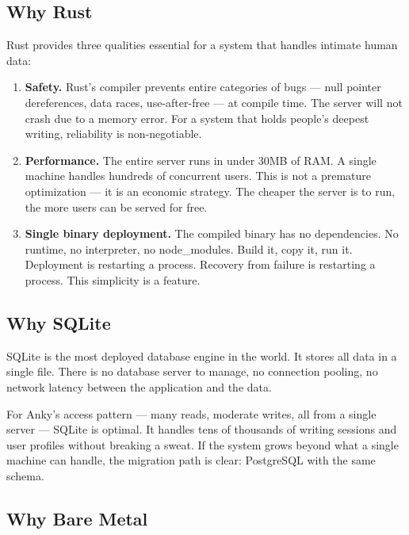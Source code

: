 \documentclass[12pt, a4paper]{article}
\begin{document}
\subsection{Why Rust}

Rust provides three qualities essential for a system that handles intimate human data:

\begin{enumerate}[leftmargin=2cm]
    \item \textbf{Safety.} Rust's compiler prevents entire categories of bugs --- null pointer dereferences, data races, use-after-free --- at compile time. The server will not crash due to a memory error. For a system that holds people's deepest writing, reliability is non-negotiable.

    \item \textbf{Performance.} The entire server runs in under 30MB of RAM. A single machine handles hundreds of concurrent users. This is not a premature optimization --- it is an economic strategy. The cheaper the server is to run, the more users can be served for free.

    \item \textbf{Single binary deployment.} The compiled binary has no dependencies. No runtime, no interpreter, no node\_modules. Build it, copy it, run it. Deployment is restarting a process. Recovery from failure is restarting a process. This simplicity is a feature.
\end{enumerate}

\subsection{Why SQLite}

SQLite is the most deployed database engine in the world. It stores all data in a single file. There is no database server to manage, no connection pooling, no network latency between the application and the data.

For Anky's access pattern --- many reads, moderate writes, all from a single server --- SQLite is optimal. It handles tens of thousands of writing sessions and user profiles without breaking a sweat. If the system grows beyond what a single machine can handle, the migration path is clear: PostgreSQL with the same schema.

\subsection{Why Bare Metal}
\end{document}
